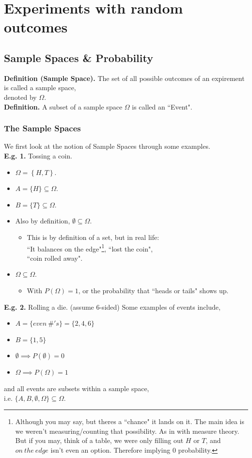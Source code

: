 \documentclass[12pt]{book}
\begin{document}
\chapter{Experiments with random outcomes}
\section{Sample Spaces \& Probability}
\textbf{Definition (Sample Space).}  The set of all possible outcomes of an expirement is called a sample space, \\denoted by $\Omega$.\\

\noindent \textbf{Definition.} A subset of a sample space $\Omega$ is called an ``Event". 

\subsection{The Sample Spaces}
We first look at the notion of Sample Spaces through some examples.\\
\textbf{E.g. 1.} Tossing a coin.
\begin{itemize}
\item$\Omega=\left\{ H,T \right\}$.
\item$A=\{H\}\subseteq \Omega$.
\item$B=\{T\}\subseteq \Omega$.
\item Also by definition, $\emptyset \subseteq \Omega$.
\begin{itemize}
\item This is by definition of a set, but in real life:\\``It balances on the edge"\footnote{Although you may say, but theres a ``chance" it lands on it. The main idea is we weren't measuring/counting that possibility. As in with measure theory. But if you may, think of a table, we were only filling out $H$ or $T$, and $on~the~edge$ isn't even an option. Therefore implying 0 probability.}, ``lost the coin", \\``coin rolled away".
\end{itemize}
\item $\Omega \subseteq \Omega$.
\begin{itemize}
\item With $P(\Omega)=1$, or the probability that ``heads or tails" shows up. 
\end{itemize}
\end{itemize}

\noindent\textbf{E.g. 2.} Rolling a die. (assume 6-sided)
Some examples of events include, 
\begin{itemize}
\item $A = \{ even~\#'s \} = \{ 2,4,6 \}$
\item $B = \{ 1,5 \}$
\item $\emptyset \implies P(\emptyset) = 0$
\item$\Omega \implies P(\Omega) = 1$
\end{itemize}
and all events are subsets within a sample space,\\
i.e. $\{ A,B,\emptyset, \Omega \} \subseteq \Omega$.\\
\end{document}
